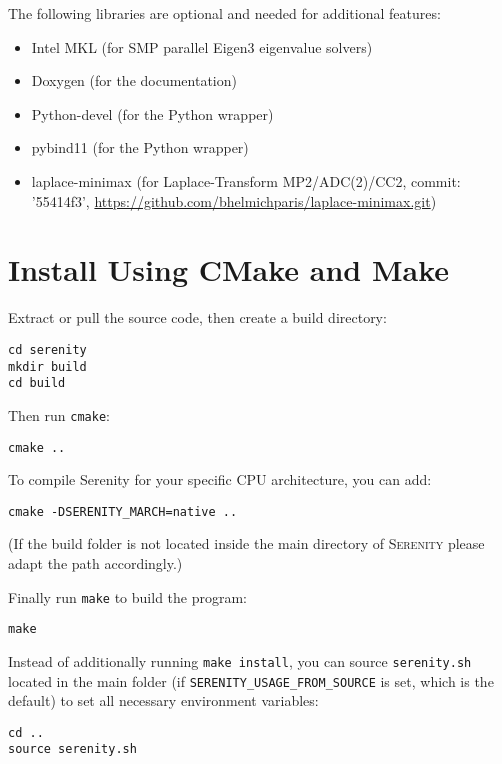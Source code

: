 The following libraries are optional and needed for additional features:
\begin{itemize}
 \item Intel MKL (for SMP parallel Eigen3 eigenvalue solvers)
 \item Doxygen (for the documentation)
 \item Python-devel (for the Python wrapper)
 \item pybind11 (for the Python wrapper)
 \item laplace-minimax (for Laplace-Transform MP2/ADC(2)/CC2, commit: '55414f3', \url{https://github.com/bhelmichparis/laplace-minimax.git})
\end{itemize}

\section{Install Using CMake and Make}

Extract or pull the source code, then create a build directory:
\begin{lstlisting}
cd serenity
mkdir build
cd build
\end{lstlisting}
Then run \texttt{cmake}:
\begin{lstlisting}
cmake ..
\end{lstlisting}
To compile Serenity for your specific CPU architecture, you can add:
\begin{lstlisting}
cmake -DSERENITY_MARCH=native ..
\end{lstlisting}
(If the build folder is not located inside the main directory of \textsc{Serenity}
please adapt the path accordingly.)

Finally run \texttt{make} to build the program:
\begin{lstlisting}
make
\end{lstlisting}
Instead of additionally running \texttt{make install}, you can source \texttt{serenity.sh} located in the main folder (if \texttt{SERENITY\_USAGE\_FROM\_SOURCE} is set, which is the default) to set all necessary environment variables:
\begin{lstlisting}
cd ..
source serenity.sh
\end{lstlisting}
